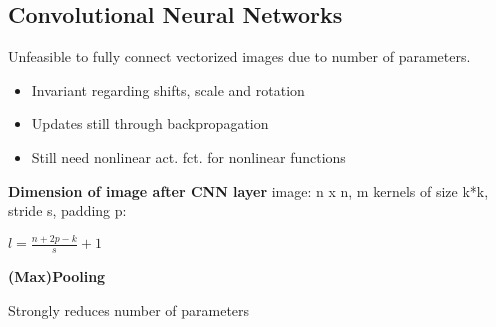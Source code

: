 \subsection{Convolutional Neural Networks}

Unfeasible to fully connect vectorized images due to number of parameters.

\begin{itemize}
    \item Invariant regarding shifts, scale and rotation
    \item Updates still through backpropagation
    \item Still need nonlinear act. fct. for nonlinear functions
\end{itemize}

\textbf{Dimension of image after CNN layer}
image: n x n, m kernels of size k*k, stride s, padding p:

\begin{center}
    $l = \frac{n + 2p -k}{s} + 1$
\end{center}

\textbf{(Max)Pooling}

Strongly reduces number of parameters
